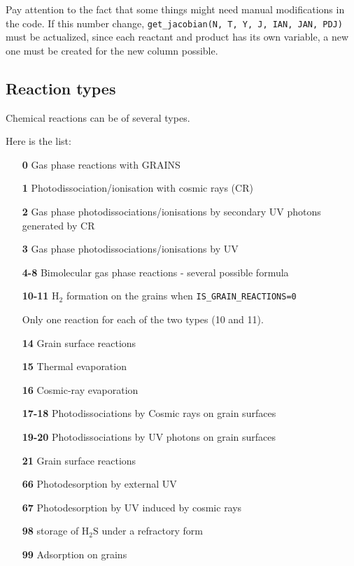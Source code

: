 \documentclass[english,a4paper,twoside]{article}
\newcommand{\molecule}[1]{\ensuremath{\mathrm{#1}}}
\begin{document}
\begin{attention}
Pay attention to the fact that some things might need manual modifications in the code. If this number change, \verb|get_jacobian(N, T, Y, J, IAN, JAN, PDJ)| must be actualized, since each reactant and product has its own variable, a new one must be created for the new column possible. 
\end{attention}

\subsection{Reaction types}
Chemical reactions can be of several types. 

Here is the list:
\begin{itemize}
\item[\textbf{0}] Gas phase reactions with GRAINS
\item[\textbf{1}] Photodissociation/ionisation with cosmic rays (CR)
\item[\textbf{2}] Gas phase photodissociations/ionisations by secondary UV photons generated by CR
\item[\textbf{3}] Gas phase photodissociations/ionisations by UV
\item[\textbf{4-8}] Bimolecular gas phase reactions - several possible formula 
\item[\textbf{10-11}] \molecule{H_2} formation on the grains when \verb|IS_GRAIN_REACTIONS=0|
\begin{remarque}
Only one reaction for each of the two types (10 and 11).
\end{remarque}
\item[\textbf{14}] Grain surface reactions
\item[\textbf{15}] Thermal evaporation
\item[\textbf{16}] Cosmic-ray evaporation
\item[\textbf{17-18}] Photodissociations by Cosmic rays on grain surfaces
\item[\textbf{19-20}] Photodissociations by UV photons on grain surfaces
\item[\textbf{21}] Grain surface reactions
\item[\textbf{66}] Photodesorption by external UV
\item[\textbf{67}] Photodesorption by UV induced by cosmic rays
\item[\textbf{98}] storage of $\molecule{H_2S}$ under a refractory form
\item[\textbf{99}] Adsorption on grains
\end{itemize}
\end{document}

